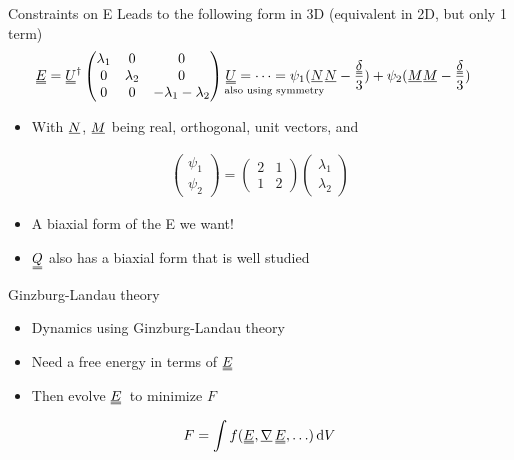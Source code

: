 \documentclass[10pt,notes]{beamer}
\newcommand{\suf}[2]{\stackunder[0.5pt]{\stackunder[1pt]{\ensuremath{#1}}{\rule{\widthof{\ensuremath{#2}}*\real{0.9}}{.1ex}}}{}}
\newcommand{\duf}[2]{\stackunder[0.5pt]{\stackunder[0.8pt]{\stackunder[1pt]{\ensuremath{#1}}{\rule{\widthof{\ensuremath{#2}}*\real{0.9}}{.1ex}}}{\rule{\widthof{\ensuremath{#2}}*\real{0.9}}{.1ex}}}{}}
\newcommand{\su}[1]{\suf{#1}{#1}}
\newcommand{\du}[1]{\duf{#1}{#1}}
\newcommand{\mgrad}{\ensuremath{\suf{\nabla}{K}\,}}
\newcommand{\EE}{\ensuremath{\du{E}}}
\begin{document}
\begin{frame}[fragile]{Constraints on E}
    \newrefsection
    Leads to the following form in 3D \color{gray} (equivalent in 2D, but only 1 term) \normalcolor
    \begin{align*}
        \du{E} &= \du{U}^\dagger \begin{pmatrix}
            \lambda_1 & 0 & 0 \\
            0 & \lambda_2 & 0 \\
            0 & 0 & - \lambda_1 - \lambda_2
        \end{pmatrix} \underset{\text{also using symmetry}}{\du{U} = \cdots = \psi_1(\su{N}}\su{N} - \frac{\du{\delta}}{3}) + \psi_2(\su{M}\su{M} - \frac{\du{\delta}}{3})
    \end{align*}
    \begin{itemize}
        \item With $\su{N}$, $\su{M}$ being real, orthogonal, unit vectors, and
    \end{itemize}
    \begin{align*}
        \begin{pmatrix} \psi_1 \\ \psi_2 \end{pmatrix} = \begin{pmatrix} 2 & 1 \\ 1 & 2 \end{pmatrix} \begin{pmatrix} \lambda_1 \\ \lambda_2 \end{pmatrix}
    \end{align*}
    \begin{itemize}
        \item A biaxial form of the E we want!
        \item \color{gray} $\du{Q}$ also has a biaxial form that is well studied \normalcolor
    \end{itemize}
\end{frame}

\begin{frame}[fragile]{Ginzburg-Landau theory}
    \newrefsection
    \begin{itemize}
        \item Dynamics using Ginzburg-Landau theory
        \item Need a free energy in terms of \EE
        \item Then evolve \EE\ to minimize $F$
    \end{itemize}
    \begin{equation*}
        F = \int f(\du{E}, \mgrad\du{E}, \ldots) \dd{V}
    \end{equation*}
\end{frame}
\end{document}
